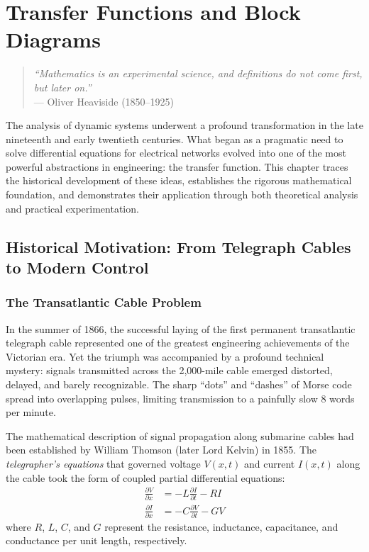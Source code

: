 
\chapter{Transfer Functions and Block Diagrams}
\label{ch:transfer_functions}

\begin{quote}
\textit{``Mathematics is an experimental science, and definitions do not come first, but later on.''}\\
--- Oliver Heaviside (1850--1925)
\end{quote}

\vspace{1em}

\noindent The analysis of dynamic systems underwent a profound transformation in the late nineteenth and early twentieth centuries. What began as a pragmatic need to solve differential equations for electrical networks evolved into one of the most powerful abstractions in engineering: the transfer function. This chapter traces the historical development of these ideas, establishes the rigorous mathematical foundation, and demonstrates their application through both theoretical analysis and practical experimentation.

\section{Historical Motivation: From Telegraph Cables to Modern Control}
\label{sec:history}

\subsection{The Transatlantic Cable Problem}

In the summer of 1866, the successful laying of the first permanent transatlantic telegraph cable represented one of the greatest engineering achievements of the Victorian era. Yet the triumph was accompanied by a profound technical mystery: signals transmitted across the 2,000-mile cable emerged distorted, delayed, and barely recognizable. The sharp ``dots'' and ``dashes'' of Morse code spread into overlapping pulses, limiting transmission to a painfully slow 8 words per minute.

The mathematical description of signal propagation along submarine cables had been established by William Thomson (later Lord Kelvin) in 1855. The \textit{telegrapher's equations} that governed voltage $V(x,t)$ and current $I(x,t)$ along the cable took the form of coupled partial differential equations:
\begin{align}
\frac{\partial V}{\partial x} &= -L\frac{\partial I}{\partial t} - RI \label{eq:telegraph1}\\
\frac{\partial I}{\partial x} &= -C\frac{\partial V}{\partial t} - GV \label{eq:telegraph2}
\end{align}
where $R$, $L$, $C$, and $G$ represent the resistance, inductance, capacitance, and conductance per unit length, respectively.

